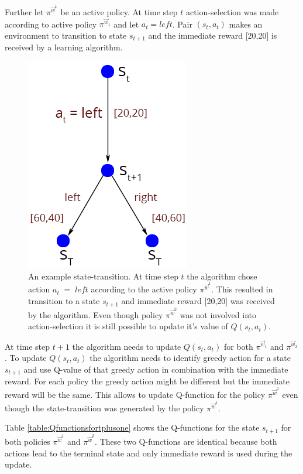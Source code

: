 Further let $ \pi^{\vec{w}^{1}} $ be an active policy. At time step $ t $ action-selection was made according to active policy $ \pi^{\vec{w}_{1}} $ and let $ a_{t}=left $. Pair $ (s_{t}, a_{t}) $ makes an environment to transition to state $ s_{t+1} $ and the immediate reward [20,20] is received by a learning algorithm.

\begin{figure}[ht]
\centering
\includegraphics[scale=0.6]{reasonForMPLearning.png}
\caption{An example state-transition. At time step $t$ the algorithm chose action $a_{t}\;=\;left$ according to the active policy $\pi^{\vec{w}^{1}}$. This resulted in transition to a state $s_{t+1}$ and immediate reward [20,20] was received by the algorithm. Even though policy $\pi^{\vec{w}^{2}}$ was not involved into action-selection it is still possible to update it's value of $Q(s_{t},a_{t})$.}
\label{fig:reasonForMPLearning}
\end{figure}

At time step $ t+1 $ the algorithm needs to update $ Q(s_{t}, a_{t}) $ for both $ \pi^{\vec{w}_{1}} $  and $ \pi^{\vec{w}_{2}} $. To update $ Q(s_{t}, a_{t}) $ the algorithm needs to identify greedy action for a state $ s_{t+1} $ and use Q-value of that greedy action in combination with the immediate reward. For each policy the greedy action might be different but the immediate reward will be the same. This allows to update Q-function for the policy $ \pi^{\vec{w}^{2}} $ even though the state-transition was generated by the policy $ \pi^{\vec{w}^{1}} $.

Table \ref{table:Qfunctionsfortplusone} shows the Q-functions for the state $ s_{t+1} $ for both policies $ \pi^{\vec{w}^{1}} $  and $ \pi^{\vec{w}^{2}} $. These two Q-functions are identical because both actions lead to the terminal state and only immediate reward is used during the update.

